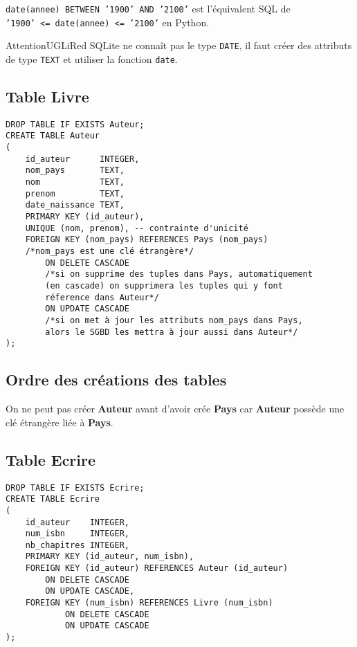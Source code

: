 \documentclass[10pt,cours,firamath]{nsi}
\begin{document}
\texttt{date(annee) BETWEEN '1900' AND '2100'} est l'équivalent SQL de\\\texttt{'1900' <= date(annee) <= '2100'} en Python.

\begin{encadrecolore}{Attention}{UGLiRed}
    SQLite ne connaît pas le type \texttt{DATE}, il faut créer des attributs de type \texttt{TEXT} et utiliser la fonction \texttt{date}. 
\end{encadrecolore}

\subsection{Table \textbf{Livre}}
\begin{sql}
    \begin{verbatim}
DROP TABLE IF EXISTS Auteur;
CREATE TABLE Auteur
(
    id_auteur      INTEGER,
    nom_pays       TEXT,
    nom            TEXT,
    prenom         TEXT,
    date_naissance TEXT,
    PRIMARY KEY (id_auteur),
    UNIQUE (nom, prenom), -- contrainte d'unicité
    FOREIGN KEY (nom_pays) REFERENCES Pays (nom_pays)
    /*nom_pays est une clé étrangère*/
        ON DELETE CASCADE
        /*si on supprime des tuples dans Pays, automatiquement
        (en cascade) on supprimera les tuples qui y font
        réference dans Auteur*/
        ON UPDATE CASCADE
        /*si on met à jour les attributs nom_pays dans Pays,
        alors le SGBD les mettra à jour aussi dans Auteur*/
);\end{verbatim}
\end{sql}

\subsection{Ordre des créations des tables}
On ne peut pas créer \textbf{Auteur} avant d'avoir crée \textbf{Pays} car \textbf{Auteur} possède une clé étrangère liée à \textbf{Pays}.


\subsection{Table \textbf{Ecrire}}
\begin{sql}
    \begin{verbatim}
DROP TABLE IF EXISTS Ecrire;
CREATE TABLE Ecrire
(
    id_auteur    INTEGER,
    num_isbn     INTEGER,
    nb_chapitres INTEGER,
    PRIMARY KEY (id_auteur, num_isbn),
    FOREIGN KEY (id_auteur) REFERENCES Auteur (id_auteur)
        ON DELETE CASCADE
        ON UPDATE CASCADE,
    FOREIGN KEY (num_isbn) REFERENCES Livre (num_isbn)
            ON DELETE CASCADE
            ON UPDATE CASCADE
);
\end{verbatim}
\end{sql}
\end{document}
